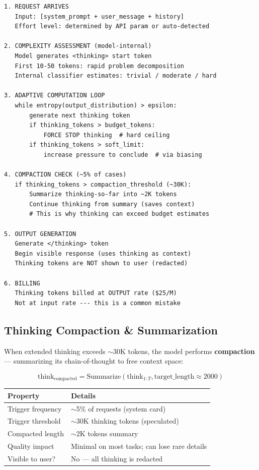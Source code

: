 \documentclass[11pt,a4paper]{article}
\begin{document}
\begin{tcolorbox}[colback=blue!3, colframe=blue!60!black, title={\bfseries How Thinking Works Internally (Speculative)}]
\begin{lstlisting}[basicstyle=\ttfamily\small, frame=none, backgroundcolor=\color{blue!3}]
1. REQUEST ARRIVES
   Input: [system_prompt + user_message + history]
   Effort level: determined by API param or auto-detected
   
2. COMPLEXITY ASSESSMENT (model-internal)
   Model generates <thinking> start token
   First 10-50 tokens: rapid problem decomposition
   Internal classifier estimates: trivial / moderate / hard
   
3. ADAPTIVE COMPUTATION LOOP
   while entropy(output_distribution) > epsilon:
       generate next thinking token
       if thinking_tokens > budget_tokens:
           FORCE STOP thinking  # hard ceiling
       if thinking_tokens > soft_limit:
           increase pressure to conclude  # via biasing
   
4. COMPACTION CHECK (~5% of cases)
   if thinking_tokens > compaction_threshold (~30K):
       Summarize thinking-so-far into ~2K tokens
       Continue thinking from summary (saves context)
       # This is why thinking can exceed budget estimates
   
5. OUTPUT GENERATION
   Generate </thinking> token
   Begin visible response (uses thinking as context)
   Thinking tokens are NOT shown to user (redacted)
   
6. BILLING
   Thinking tokens billed at OUTPUT rate ($25/M)
   Not at input rate --- this is a common mistake
\end{lstlisting}
\end{tcolorbox}

\subsection{Thinking Compaction \& Summarization}

When extended thinking exceeds $\sim$30K tokens, the model performs \textbf{compaction} --- summarizing its chain-of-thought to free context space:

$$\text{think}_{\text{compacted}} = \text{Summarize}(\text{think}_{1:T}, \text{target\_length} \approx 2000)$$

\begin{center}
\begin{tabular}{ll}
\toprule
\textbf{Property} & \textbf{Details} \\
\midrule
Trigger frequency & $\sim$5\% of requests (system card) \\
Trigger threshold & $\sim$30K thinking tokens (speculated) \\
Compacted length & $\sim$2K tokens summary \\
Quality impact & Minimal on most tasks; can lose rare details \\
Visible to user? & No --- all thinking is redacted \\
\bottomrule
\end{tabular}
\end{center}
\end{document}
